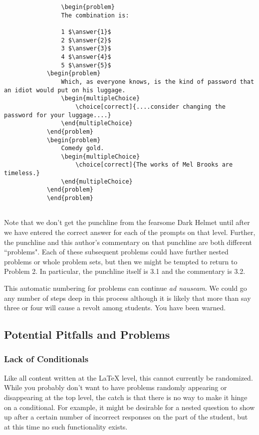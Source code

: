 \documentclass{ximera}
\begin{document}
            
            \begin{verbatim}
                \begin{problem}
                The combination is:
            
                1 $\answer{1}$
                2 $\answer{2}$
                3 $\answer{3}$
                4 $\answer{4}$
                5 $\answer{5}$
            \begin{problem}
                Which, as everyone knows, is the kind of password that an idiot would put on his luggage.
                \begin{multipleChoice}
                    \choice[correct]{....consider changing the password for your luggage....}
                \end{multipleChoice}
            \end{problem}
            \begin{problem}
                Comedy gold.
                \begin{multipleChoice}
                    \choice[correct]{The works of Mel Brooks are timeless.}
                \end{multipleChoice}
            \end{problem}
            \end{problem}
            
            \end{verbatim}
            
            Note that we don't get the punchline from the fearsome Dark Helmet until after we have entered the correct answer for each of the prompts on that level. Further, the punchline and this author's commentary on that punchline are both different ``problems".  Each of these subsequent problems could have further nested problems or whole problem sets, but then we might be tempted to return to Problem 2.  In particular, the punchline itself is 3.1 and the commentary is 3.2. 
            
            This automatic numbering for problems can continue \textit{ad nauseam}.  We could go any number of steps deep in this process although it is likely that more than say three or four will cause a revolt among students.  You have been warned.
            

    
    \subsection{Potential Pitfalls and Problems}
        \subsubsection{Lack of Conditionals}
            Like all content written at the LaTeX level, this cannot currently be randomized.  While you probably don't want to have problems randomly appearing or disappearing at the top level, the catch is that there is no way to make it hinge on a conditional.  For example, it might be desirable for a nested question to show up after a certain number of incorrect responses on the part of the student, but at this time no such functionality exists.
\end{document}

